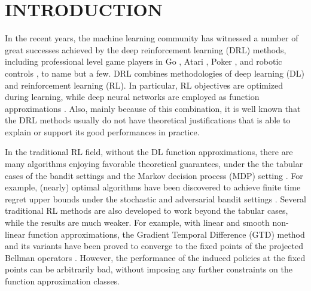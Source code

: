 \section{INTRODUCTION}
\label{sec:introduction}

In the recent years, the machine learning community has witnessed a number of great successes achieved by the deep reinforcement learning (DRL) methods, including professional level game players in Go \citep{silver2016masteringA,silver2017masteringB}, Atari \citep{mnih2015human}, Poker \citep{moravvcik2017deepstack}, and robotic controls \citep{lillicrap2015continuous,levine2016end}, to name but a few. DRL combines methodologies of deep learning (DL) and reinforcement learning (RL). In particular, RL objectives are optimized during learning, while deep neural networks are employed as function approximations \citep{sutton2018reinforcement}. Also, mainly because of this combination, it is well known that the DRL methods usually do not have theoretical justifications that is able to explain or support its good performances in practice.

In the traditional RL field, without the DL function approximations, there are many algorithms enjoying favorable theoretical guarantees, under the the tabular cases of the bandit settings and the Markov decision process (MDP) setting \citep{sutton2018reinforcement}. For example, (nearly) optimal algorithms have been discovered to achieve finite time regret upper bounds under the stochastic and adversarial bandit settings \citep{bubeck2012regret}. Several traditional RL methods are also developed to work beyond the tabular cases, while the results are much weaker. For example, with linear and smooth non-linear function approximations, the Gradient Temporal Difference (GTD) method and its variants have been proved to converge to the fixed points of the projected Bellman operators \citep{sutton2009fast,sutton2009convergent,bhatnagar2009convergent}. However, the performance of the induced policies at the fixed points can be arbitrarily bad, without imposing any further constraints on the function approximation classes.


